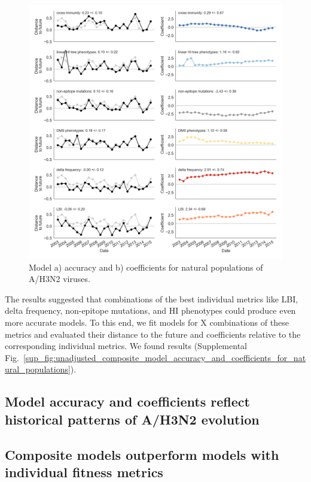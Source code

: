 \begin{figure}[t]
  \begin{center}
  \includegraphics[width=\textwidth]{figures/unadjusted-model-accuracy-and-coefficients-for-natural-populations.png}
  \caption{Model a) accuracy and b) coefficients for natural populations of A/H3N2 viruses.}
  \label{fig:unadjusted_model_accuracy_and_coefficients_for_natural_populations}
  \end{center}
\end{figure}

The results suggested that combinations of the best individual metrics like LBI, delta frequency, non-epitope mutations, and HI phenotypes could produce even more accurate models.
To this end, we fit models for X combinations of these metrics and evaluated their distance to the future and coefficients relative to the corresponding individual metrics.
We found results (Supplemental Fig.~\ref{sup_fig:unadjusted_composite_model_accuracy_and_coefficients_for_natural_populations}).

\subsection*{Model accuracy and coefficients reflect historical patterns of A/H3N2 evolution}

\subsection*{Composite models outperform models with individual fitness metrics}

